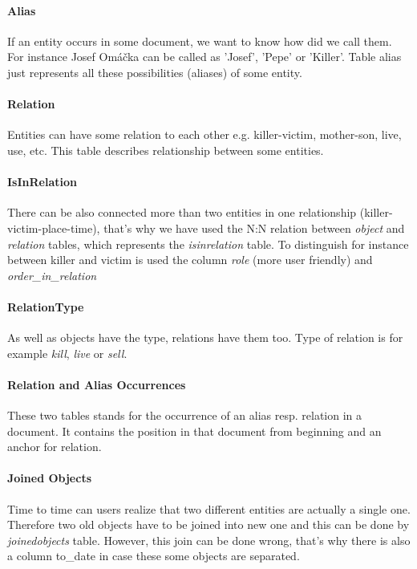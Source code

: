 \paragraph{Alias} If an entity occurs in some document, we want to know how did we call them. For instance Josef Omáčka can be called as 'Josef', 'Pepe' or 'Killer'. Table alias just represents all these possibilities (aliases) of some entity.

\paragraph{Relation} Entities can have some relation to each other e.g. killer-victim, mother-son, live, use, etc. This table describes relationship between some entities. 

\paragraph{IsInRelation} There can be also connected more than two entities in one relationship (killer-victim-place-time), that's why we have used the N:N relation between \emph{object} and \emph{relation} tables, which represents the \emph{isinrelation} table. To distinguish for instance between killer and victim is used the column \emph{role} (more user friendly) and \emph{order\_{}in\_{}relation} 

\paragraph{RelationType} As well as objects have the type, relations have them too. Type of relation is for example \emph{kill}, \emph{live} or \emph{sell}.

\paragraph{Relation and Alias Occurrences} These two tables stands for the occurrence of an alias resp. relation in a document. It contains the position in that document from beginning and an anchor for relation.

\paragraph{Joined Objects} Time to time can users realize that two different entities are actually a single one. Therefore two old objects have to be joined into new one and this can be done by \emph{joinedobjects} table. However, this join can be done wrong, that's why there is also a column to\_{}date in case these some objects are separated.

